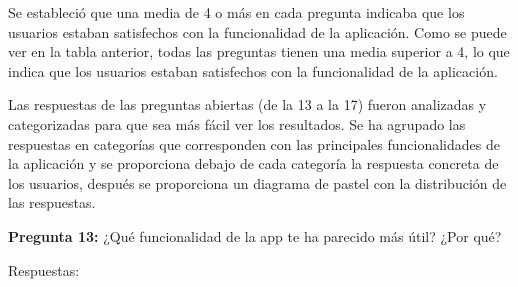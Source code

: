 Se estableció que una media de 4 o más en cada pregunta indicaba que los usuarios estaban satisfechos con la funcionalidad de la aplicación. 
Como se puede ver en la tabla anterior, todas las preguntas tienen una media superior a 4, lo que indica que los usuarios estaban satisfechos 
con la funcionalidad de la aplicación.


Las respuestas de las preguntas abiertas (de la 13 a la 17) fueron analizadas y categorizadas para que sea más fácil ver los resultados. Se ha agrupado las respuestas en categorías 
que corresponden con las principales funcionalidades de la aplicación y se proporciona debajo de cada categoría la respuesta concreta de los usuarios, después se proporciona un diagrama de pastel con la distribución de las respuestas.


\textbf{Pregunta 13:} ¿Qué funcionalidad de la app te ha parecido más útil? ¿Por qué?

Respuestas:

